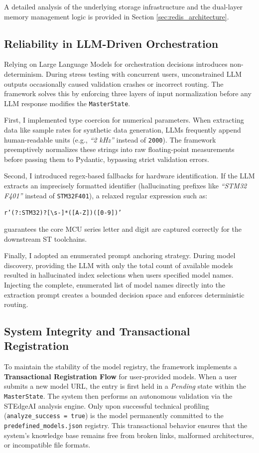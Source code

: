 A detailed analysis of the underlying storage infrastructure and the dual-layer memory management logic is provided in Section \ref{sec:redis_architecture}.

\subsection{Reliability in LLM-Driven Orchestration}

Relying on Large Language Models for orchestration decisions introduces non-determinism. During stress testing with concurrent users, unconstrained LLM outputs occasionally caused validation crashes or incorrect routing. The framework solves this by enforcing three layers of input normalization before any LLM response modifies the \texttt{MasterState}.

First, I implemented type coercion for numerical parameters. When extracting data like sample rates for synthetic data generation, LLMs frequently append human-readable units (e.g., \textit{``2 kHz''} instead of \texttt{2000}). The framework preemptively normalizes these strings into raw floating-point measurements before passing them to Pydantic, bypassing strict validation errors.

Second, I introduced regex-based fallbacks for hardware identification. If the LLM extracts an imprecisely formatted identifier (hallucinating prefixes like \textit{``STM32 F401''} instead of \texttt{STM32F401}), a relaxed regular expression such as:

\texttt{r'(?:STM32)?[\textbackslash{}s-]*([A-Z])([0-9])'}

\noindent guarantees the core MCU series letter and digit are captured correctly for the downstream ST toolchains.

Finally, I adopted an enumerated prompt anchoring strategy. During model discovery, providing the LLM with only the total count of available models resulted in hallucinated index selections when users specified model names. Injecting the complete, enumerated list of model names directly into the extraction prompt creates a bounded decision space and enforces deterministic routing.

\subsection{System Integrity and Transactional Registration}

To maintain the stability of the model registry, the framework implements a \textbf{Transactional Registration Flow} for user-provided models. When a user submits a new model URL, the entry is first held in a \textit{Pending} state within the \texttt{MasterState}. The system then performs an autonomous validation via the STEdgeAI analysis engine. Only upon successful technical profiling (\texttt{analyze\_success = true}) is the model permanently committed to the \texttt{predefined\_models.json} registry. This transactional behavior ensures that the system's knowledge base remains free from broken links, malformed architectures, or incompatible file formats.

